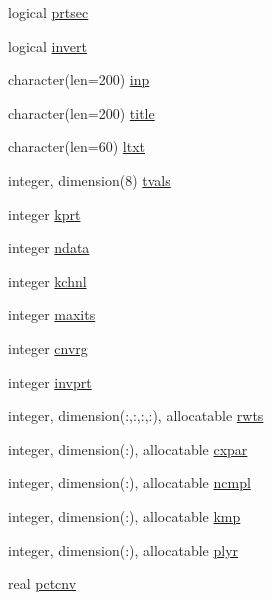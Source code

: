 \begin{DoxyCompactItemize}
\item 
logical \hyperlink{namespacelg__input__routines_ac5e8dec1c471c81460b4a0f5072f8032}{prtsec}
\item 
logical \hyperlink{namespacelg__input__routines_a8a8f780e770a419032c0f864583b10b3}{invert}
\item 
character(len=200) \hyperlink{namespacelg__input__routines_a288298e67f0d988bf7778f7d3e647080}{inp}
\item 
character(len=200) \hyperlink{namespacelg__input__routines_a1ef30ce0b5dc7f1606ca274a96f4f69b}{title}
\item 
character(len=60) \hyperlink{namespacelg__input__routines_a5c20852fa900259b8802ce90a90242fd}{ltxt}
\item 
integer, dimension(8) \hyperlink{namespacelg__input__routines_a9effaf2dd14fcded391b9aa0024209e7}{tvals}
\item 
integer \hyperlink{namespacelg__input__routines_a3f207750b44b385fd4cfdfee777d99a7}{kprt}
\item 
integer \hyperlink{namespacelg__input__routines_af3dfe10c558a9f2f5ef8e1f6cb8f2770}{ndata}
\item 
integer \hyperlink{namespacelg__input__routines_ad615d7fb943281d8f06d4c1f45401a53}{kchnl}
\item 
integer \hyperlink{namespacelg__input__routines_a8a8ac5810a5450735ae16a17775adb2e}{maxits}
\item 
integer \hyperlink{namespacelg__input__routines_aa67064f3118bc318702e1ca97b197a05}{cnvrg}
\item 
integer \hyperlink{namespacelg__input__routines_a2efdd9d0ee189172094271241f63d28c}{invprt}
\item 
integer, dimension(\+:,\+:,\+:,\+:), allocatable \hyperlink{namespacelg__input__routines_aead04e44b19b3354442aae287652c5ac}{rwts}
\item 
integer, dimension(\+:), allocatable \hyperlink{namespacelg__input__routines_aa1ea996394cf4a5e7b496595554acf71}{cxpar}
\item 
integer, dimension(\+:), allocatable \hyperlink{namespacelg__input__routines_ac804800fe349f842e1ffe85c1a0d3410}{ncmpl}
\item 
integer, dimension(\+:), allocatable \hyperlink{namespacelg__input__routines_af32e9ed8c544fe3339169f3f1c3993d5}{kmp}
\item 
integer, dimension(\+:), allocatable \hyperlink{namespacelg__input__routines_afcc12c2fb333b7b2b66ef0d4412ce04e}{plyr}
\item 
real \hyperlink{namespacelg__input__routines_ac6b4323af4ccd6ac9f0415f7c856302f}{pctcnv}

\end{DoxyCompactItemize}
